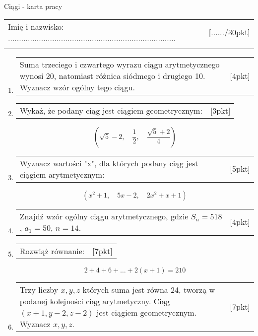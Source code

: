\documentclass[12pt,a4paper]{article}
\begin{document}
	\begin{center}
		\LARGE Ciągi - karta pracy
	\end{center}
	\vspace{1.5cm}
	\begin{tabular}{p{13cm} r}
		Imię i nazwisko: ............................................................................
		&[....../30pkt]\\ 
		\vspace{0.5cm}
	\end{tabular}
	\begin{enumerate}[1.]
		\item  \begin{tabular}{p{13cm} r}
			Suma trzeciego i czwartego wyrazu ciągu arytmetycznego wynosi 20, natomiast różnica siódmego i drugiego 10. Wyznacz wzór ogólny tego ciągu. &[4pkt]\\ 
		\end{tabular}
	
	\item  \begin{tabular}{p{13cm} r}
		Wykaż, że podany ciąg jest ciągiem geometrycznym: &[3pkt]\\ 
	\end{tabular}
	$$(\sqrt{5}-2, \quad \frac{1}{2}, \quad \frac{\sqrt{5}+2}{4})$$
	\item  \begin{tabular}{p{13cm} r}
		Wyznacz wartości "x", dla których podany ciąg jest ciągiem arytmetycznym: &[5pkt]\\ 
	\end{tabular}
		$$(x^2+1,\quad 5x-2, \quad 2x^2+x+1)$$
		
		\item  \begin{tabular}{p{13cm} r}
			Znajdź wzór ogólny ciągu arytmetycznego, gdzie $S_n=518$, $a_1=50$, $n=14$. &[4pkt]\\ 
		\end{tabular}
	
	\item  \begin{tabular}{p{13cm} r}
		Rozwiąż równanie: &[7pkt]\\ 
	\end{tabular}

	$$2+4+6+\dots + 2(x+1) = 210$$
	
	\item  \begin{tabular}{p{13cm} r}
		Trzy liczby $x,y,z$ których suma jest równa 24, tworzą w podanej kolejności ciąg arytmetyczny. Ciąg $(x+1,y-2,z-2)$ jest ciągiem geometrycznym. Wyznacz $x,y,z$. &[7pkt]\\ 
	\end{tabular}

	\end{enumerate}
	
\end{document}
